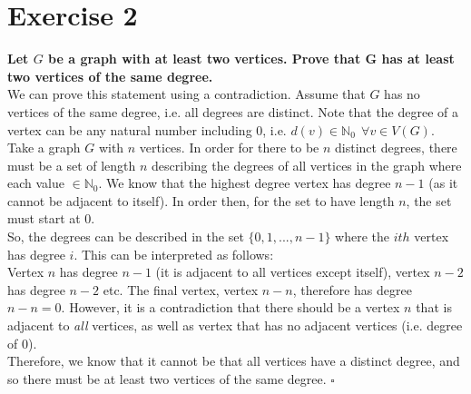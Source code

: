 \section*{Exercise 2}
\boldmath
\textbf{Let $G$ be a graph with at least two vertices. Prove that G has at least two vertices of the same degree.} \\
\linebreak 
\unboldmath
We can prove this statement using a contradiction. Assume that $G$ has no vertices of the same degree, i.e. all degrees are distinct. Note that the degree of a vertex can be any natural number including 0, i.e. $d(v) \in \mathbb{N}_0 \:\: \forall v \in V(G)$. \\
\linebreak 
Take a graph $G$ with $n$ vertices. In order for there to be $n$ distinct degrees, there must be a set of length $n$ describing the degrees of all vertices in the graph where each value $\in \mathbb{N}_0$. We know that the highest degree vertex has degree $n-1$ (as it cannot be adjacent to itself). In order then, for the set to have length $n$, the set must start at 0.  \\
\linebreak 
So, the degrees can be described in the set $\{0, 1, ..., n-1\}$ where the $ith$ vertex has degree $i$. This can be interpreted as follows: \\
\linebreak 
Vertex $n$ has degree $n-1$ (it is adjacent to all vertices except itself), vertex $n-2$ has degree $n-2$ etc. %
The final vertex, vertex $n-n$, therefore has degree $n-n = 0$. However, it is a contradiction that there should be a vertex $n$ that is adjacent to \textit{all} vertices, as well as vertex that has no adjacent vertices (i.e. degree of 0). \\
\linebreak 
Therefore, we know that it cannot be that all vertices have a distinct degree, and so there must be at least two vertices of the same degree. \hspace*{10mm} $\square$\\


